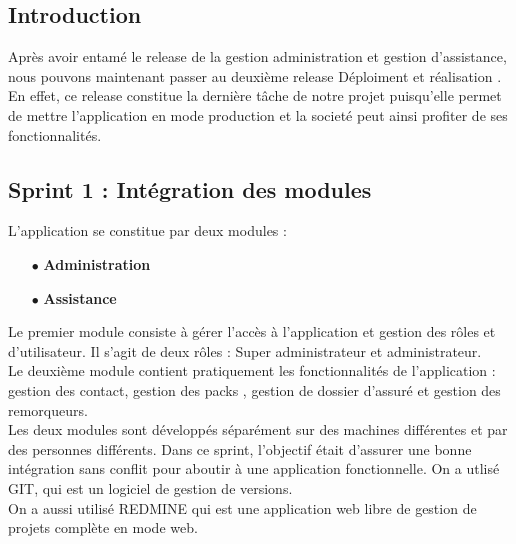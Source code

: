 \documentclass{article}
\begin{document}
\subsection{Introduction}
Après avoir entamé le release de la gestion administration et gestion d'assistance,
nous pouvons maintenant passer au deuxième release \guillemotleft Déploiment et réalisation \guillemotright.
En effet, ce release constitue la dernière tâche  de notre projet puisqu'elle permet de mettre l'application en mode production et la societé peut ainsi profiter de ses fonctionnalités.
\subsection{Sprint 1 : Intégration des modules }
L'application se constitue par deux modules : \\
\begin{enumerate}
\item[$\bullet$] \textbf{ Administration}
\item[$\bullet$] \textbf{ Assistance }
\end{enumerate}
Le premier module consiste à gérer l'accès à l'application et gestion des rôles et d'utilisateur.
Il s'agit de deux rôles : Super administrateur et administrateur.\\
Le deuxième module contient pratiquement les fonctionnalités de l'application : gestion des contact, gestion des packs , gestion de dossier d'assuré et gestion des remorqueurs.\\
Les deux modules sont développés séparément sur des machines différentes et par des personnes différents. Dans ce sprint, l'objectif était d'assurer une bonne intégration sans conflit pour aboutir à une application fonctionnelle.
On a utlisé GIT, qui est un logiciel de gestion de versions.\\
On a aussi utilisé REDMINE qui est une application web libre de gestion de projets complète en mode web. 
\end{document}
